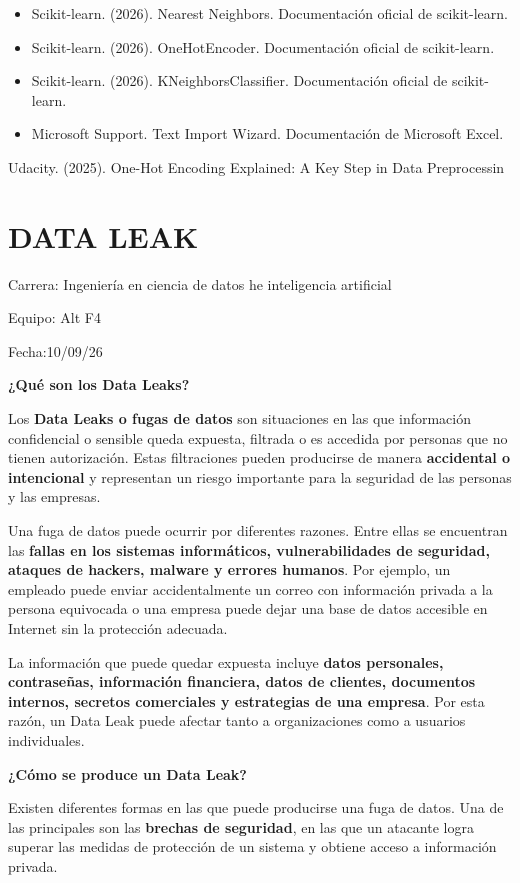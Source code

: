 \documentclass[]{article}
\begin{document}
\begin{itemize}
\item
  Scikit-learn. (2026). Nearest Neighbors. Documentación oficial de
  scikit-learn.
\item
  Scikit-learn. (2026). OneHotEncoder. Documentación oficial de
  scikit-learn.
\item
  Scikit-learn. (2026). KNeighborsClassifier. Documentación oficial de
  scikit-learn.
\item
  Microsoft Support. Text Import Wizard. Documentación de Microsoft
  Excel.
\end{itemize}

Udacity. (2025). One-Hot Encoding Explained: A Key Step in Data
Preprocessin

\section{DATA LEAK}\label{data-leak}

Carrera: Ingeniería en ciencia de datos he inteligencia artificial

Equipo: Alt F4

Fecha:10/09/26

\textbf{¿Qué son los Data Leaks?}

Los \textbf{Data Leaks o fugas de datos} son situaciones en las que
información confidencial o sensible queda expuesta, filtrada o es
accedida por personas que no tienen autorización. Estas filtraciones
pueden producirse de manera \textbf{accidental o intencional} y
representan un riesgo importante para la seguridad de las personas y las
empresas.

Una fuga de datos puede ocurrir por diferentes razones. Entre ellas se
encuentran las \textbf{fallas en los sistemas informáticos,
vulnerabilidades de seguridad, ataques de hackers, malware y errores
humanos}. Por ejemplo, un empleado puede enviar accidentalmente un
correo con información privada a la persona equivocada o una empresa
puede dejar una base de datos accesible en Internet sin la protección
adecuada.

La información que puede quedar expuesta incluye \textbf{datos
personales, contraseñas, información financiera, datos de clientes,
documentos internos, secretos comerciales y estrategias de una empresa}.
Por esta razón, un Data Leak puede afectar tanto a organizaciones como a
usuarios individuales.

\textbf{¿Cómo se produce un Data Leak?}

Existen diferentes formas en las que puede producirse una fuga de datos.
Una de las principales son las \textbf{brechas de seguridad}, en las que
un atacante logra superar las medidas de protección de un sistema y
obtiene acceso a información privada.
\end{document}
